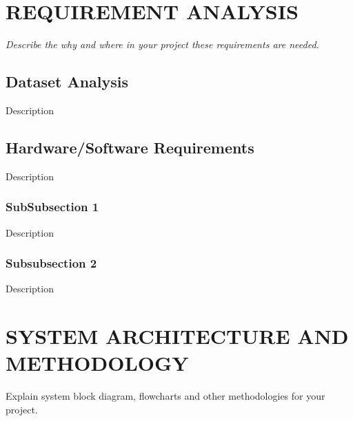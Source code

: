 \documentclass{ioereport}
\begin{document}
    \pagebreak

\section{\MakeUppercase{Requirement Analysis}}
    \textit{Describe the why and where in your project these requirements are needed.}
    \subsection{Dataset Analysis}
    Description
    \subsection{Hardware/Software Requirements}
    Description
        \subsubsection{SubSubsection 1}
        Description
        \subsubsection{Subsubsection 2}
        Description

    \pagebreak
    
\section{\MakeUppercase{System Architecture and Methodology}}
    Explain system block diagram, flowcharts and other methodologies for your project.
    
\end{document}
